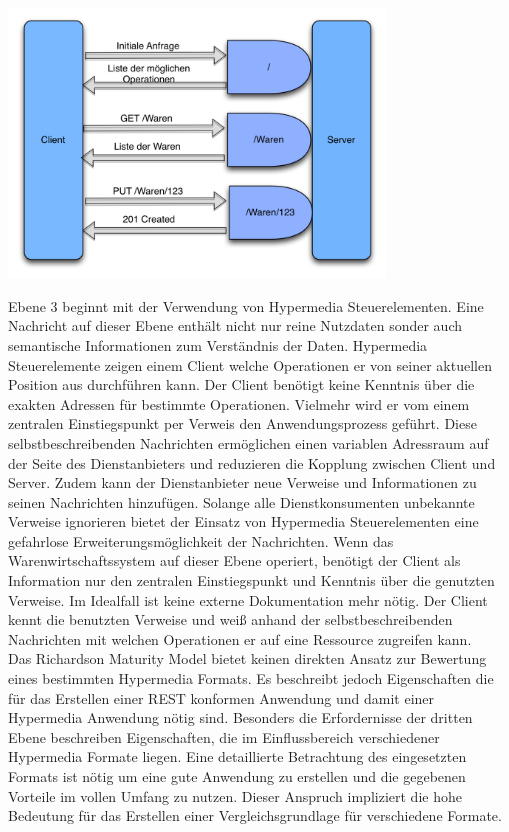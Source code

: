 \begin{center}
		\includegraphics[width=10cm]{graphicx/MaturityLvL3.png}
		\label{hfaktoren}
	\end{center}
Ebene 3 beginnt mit der Verwendung von Hypermedia Steuerelementen. Eine Nachricht auf dieser Ebene enthält nicht nur reine Nutzdaten sonder auch semantische Informationen zum Verständnis der Daten. Hypermedia Steuerelemente zeigen einem Client welche Operationen er von seiner aktuellen Position aus durchführen kann. Der Client benötigt keine Kenntnis über die exakten Adressen für bestimmte Operationen. Vielmehr wird er vom einem zentralen Einstiegspunkt per Verweis den Anwendungsprozess geführt. Diese selbstbeschreibenden Nachrichten ermöglichen einen variablen Adressraum auf der Seite des Dienstanbieters und reduzieren die Kopplung zwischen Client und Server. Zudem kann der Dienstanbieter neue Verweise und Informationen zu seinen Nachrichten hinzufügen. Solange alle Dienstkonsumenten unbekannte Verweise ignorieren bietet der Einsatz von Hypermedia Steuerelementen eine gefahrlose Erweiterungsmöglichkeit der Nachrichten. Wenn das Warenwirtschaftssystem auf dieser Ebene operiert, benötigt der Client als Information nur den zentralen Einstiegspunkt und Kenntnis über die genutzten Verweise. Im Idealfall ist keine externe Dokumentation mehr nötig. Der Client kennt die benutzten Verweise und weiß anhand der selbstbeschreibenden Nachrichten mit welchen Operationen er auf eine Ressource zugreifen kann.\\
Das Richardson Maturity Model bietet keinen direkten Ansatz zur Bewertung eines bestimmten Hypermedia Formats. Es beschreibt jedoch Eigenschaften die für das Erstellen einer REST konformen Anwendung und damit einer Hypermedia Anwendung nötig sind. Besonders die Erfordernisse der dritten Ebene beschreiben Eigenschaften, die im Einflussbereich verschiedener Hypermedia Formate liegen. Eine detaillierte Betrachtung des eingesetzten Formats ist nötig um eine gute Anwendung zu erstellen und die gegebenen Vorteile im vollen Umfang zu nutzen. Dieser Anspruch impliziert die hohe Bedeutung für das Erstellen einer Vergleichsgrundlage für verschiedene Formate.









